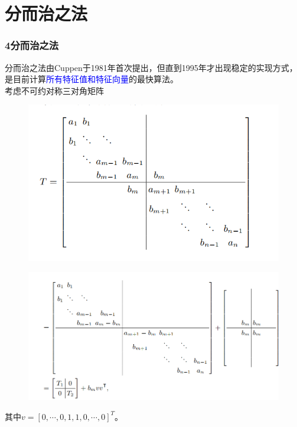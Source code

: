 \documentclass[notheorems,serif]{beamer}
\begin{document}
\section{分而治之法}
\begin{frame}
\frametitle{4\qquad 分而治之法}

分而治之法由Cuppen于1981年首次提出，但直到1995年才出现稳定的实现方式，是目前计算\textcolor{blue}{所有特征值和特征向量}的最快算法。\\
考虑不可约对称三对角矩阵
\begin{figure}
	\begin{center}
		\includegraphics[scale=0.5]{figures/5-2.png}
	\end{center}
\end{figure}
\end{frame}
\begin{frame}
\begin{figure}
	\begin{center}
		\includegraphics[scale=0.39]{figures/5-3.png}
	\end{center}
\end{figure}
其中$v=[0,\cdots ,0,1,1,0,\cdots ,0]^T$。
\end{frame}
\end{document}
